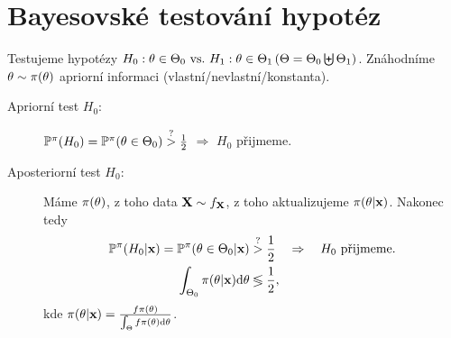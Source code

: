 \chapter{Bayesovské testování hypotéz}
Testujeme hypotézy $H_0: \theta\in\Theta_0 ~\text{vs.}~ H_1: \theta\in\Theta_1 \,(\Theta
=\Theta_0 \biguplus \Theta_1)$. Znáhodníme $\theta\sim\pi(\theta)$ apriorní informaci (vlastní/nevlastní/konstanta).
\begin{description}
	\item[Apriorní test $H_0$:] $\mathbb{P}^\pi(H_0)=\mathbb{P}^\pi(\theta\in\Theta_0)\stackrel{?}{>}\frac{1}{2}$ $\Rightarrow$ $H_0$ přijmeme.
	\item[Aposteriorní test $H_0$:] Máme $\pi(\theta)$, z toho data $\textbf{X}\sim f_{\textbf{X}}$, z toho aktualizujeme $\pi(\theta|\textbf{x})$. Nakonec tedy 
	\[
	\begin{split}
	 \mathbb{P}^\pi(H_0|\textbf{x})=\mathbb{P}^\pi(\theta\in\Theta_0|\textbf{x})&\stackrel{?}{>}\frac{1}{2}\quad\Rightarrow\quad H_0\text{ přijmeme.}\\
	 \int_{\Theta_0}\pi(\theta|\textbf{x})\mathrm{d}\theta & \lessgtr \frac{1}{2},
	\end{split}
	\]
	kde $\pi(\theta|\textbf{x})= \frac{f\pi(\theta)}{\int_\Theta f\pi(\theta)\mathrm{d}\theta}$.
\end{description}

